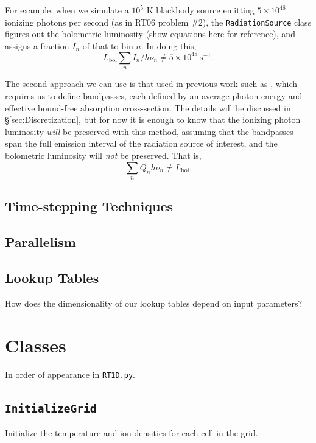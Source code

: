 \documentclass[letterpaper,titlepage,12pt]{article}
\numberwithin{equation}{section}
\begin{document}
For example, when we simulate a $10^5$ K blackbody source emitting $5\times 10^{48}$ ionizing photons per second (as in RT06 problem \#2), the \texttt{RadiationSource} class figures out the bolometric luminosity (show equations here for reference), and assigns a fraction $I_n$ of that to bin $n$.  In doing this, 
\begin{equation}
    L_{\mathrm{bol}} \sum_n I_n / h\nu_n \neq 5 \times 10^{48} \ \mathrm{s}^{-1} .
\end{equation}   

The second approach we can use is that used in previous work such as \citet{Aubert2008}, which requires us to define bandpasses, each defined by an average photon energy and effective bound-free absorption cross-section.  The details will be discussed in \S\ref{sec:Discretization}, but for now it is enough to know that the ionizing photon luminosity \textit{will} be preserved with this method, assuming that the bandpasses span the full emission interval of the radiation source of interest, and the bolometric luminosity will \textit{not} be preserved.  That is,
\begin{equation}
    \sum_n \dot{Q}_n h \nu_n \neq L_{\mathrm{bol}} .
\end{equation}    


\subsection{Time-stepping Techniques}



\subsection{Parallelism}

\subsection{Lookup Tables}
How does the dimensionality of our lookup tables depend on input parameters?

\section{Classes}
In order of appearance in \texttt{RT1D.py}.

\subsection{\texttt{InitializeGrid}}
Initialize the temperature and ion densities for each cell in the grid.
\end{document}
